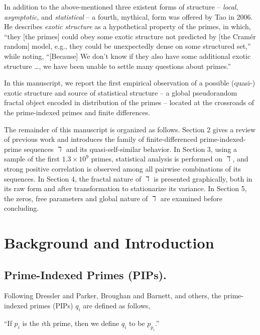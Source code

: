 \documentclass[12pt,longtitle,times]{amsart}
\begin{document}
In addition to the above-mentioned three existent forms of structure --  \textit{local}, \textit{asymptotic}, and \textit{statistical} -- a fourth, mythical, form was offered by Tao in 2006. He describes \textit{exotic structure} as a hypothetical property of the primes, in which, ``they [the primes] could obey some exotic structure not predicted by [the Cram\'{e}r random] model, e.g., they could be unexpectedly dense on some structured set,'' while noting, ``[Because] We don't know if they also have some additional exotic structure \dots, we have been unable to settle many questions about primes.''\cite{Pintz-Cramer-vs-Cramer-2007,Tao-Long-2006,Tao-Recent-Progress-2009}

In this manuscript, we report the first empirical observation of a possible (quasi-) exotic structure and source of statistical structure -- a global pseudorandom fractal object encoded in distribution of the primes -- located at the crossroads of the prime-indexed primes and finite differences.

The remainder of this manuscript is organized as follows. Section 2 gives a review of previous work and introduces the family of finite-differenced prime-indexed-prime sequences $\daleth$ and its quasi-self-similar behavior. In Section 3, using a sample of the first $1.3\times{}10^9$ primes, statistical analysis is performed on $\daleth$, and strong positive correlation is observed among all pairwise combinations of its sequences. In Section 4, the fractal nature of $\daleth$ is presented graphically, both in its raw form and after transformation to stationarize its variance. In Section 5, the zeros, free parameters and global nature of $\daleth$ are examined before concluding.

\section{Background and Introduction}
\subsection{Prime-Indexed Primes (PIPs).} Following Dressler and Parker\cite{Dressler1975}, Broughan and Barnett\cite{Broughan2009}, and others\cite{Bayless2013,Jordan-On-Sums-1965}, the prime-indexed primes (PIPs) $q_i$ are defined as follows, 
\begin{center}
``If $p_i$ is the $i$th prime, then we define $q_i$ to be $p_{p_i}$.''
 \end{center}
 
\end{document}
